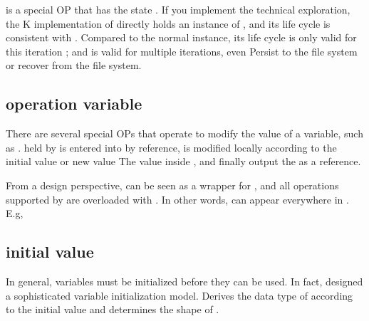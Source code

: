 \begin{content}

 is a special OP that has the state . If you implement the technical exploration, the K implementation of  directly holds an instance of , and its life cycle is consistent with . Compared to the normal  instance, its life cycle is only valid for this iteration ; and  is valid for multiple iterations, even Persist to the file system or recover from the file system.

\subsection{operation variable}

There are several special OPs that operate  to modify the value of a variable, such as .  held by  is entered into  by reference,  is modified locally according to the initial value  or new value The value inside , and finally output the  as a reference.

From a design perspective,  can be seen as a wrapper for , and all operations supported by  are overloaded with . In other words,  can appear everywhere in . E.g,


\subsection{initial value}

In general, variables must be initialized before they can be used. In fact,  designed a sophisticated variable initialization model.  Derives the data type of  according to the initial value  and determines the shape  of .


\end{content}
